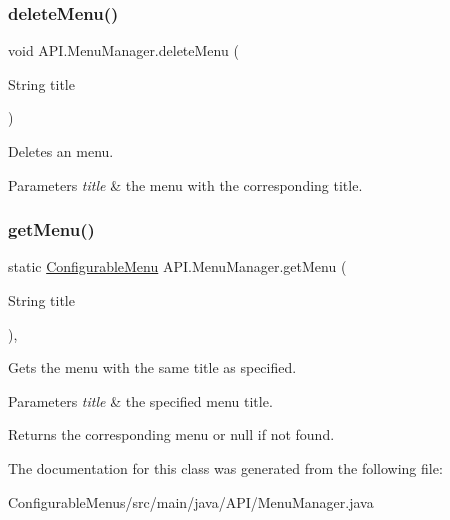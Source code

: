 \subsubsection{\texorpdfstring{delete\+Menu()}{deleteMenu()}\hspace{0.1cm}{\footnotesize\ttfamily [2/2]}}
{\footnotesize\ttfamily void A\+P\+I.\+Menu\+Manager.\+delete\+Menu (\begin{DoxyParamCaption}\item[{String}]{title }\end{DoxyParamCaption})\hspace{0.3cm}{\ttfamily [inline]}}

Deletes an menu. 
\begin{DoxyParams}{Parameters}
{\em title} & the menu with the corresponding title. \\
\hline
\end{DoxyParams}
\mbox{\label{class_a_p_i_1_1_menu_manager_a42fe754044645b83635c8611ce2f1870}} 
\subsubsection{\texorpdfstring{get\+Menu()}{getMenu()}}
{\footnotesize\ttfamily static \hyperlink{class_a_p_i_1_1_configurable_menu}{Configurable\+Menu} A\+P\+I.\+Menu\+Manager.\+get\+Menu (\begin{DoxyParamCaption}\item[{String}]{title }\end{DoxyParamCaption})\hspace{0.3cm}{\ttfamily [inline]}, {\ttfamily [static]}}

Gets the menu with the same title as specified. 
\begin{DoxyParams}{Parameters}
{\em title} & the specified menu title. \\
\hline
\end{DoxyParams}
\begin{DoxyReturn}{Returns}
the corresponding menu or null if not found. 
\end{DoxyReturn}


The documentation for this class was generated from the following file\+:\begin{DoxyCompactItemize}
\item 
Configurable\+Menus/src/main/java/\+A\+P\+I/Menu\+Manager.\+java\end{DoxyCompactItemize}
